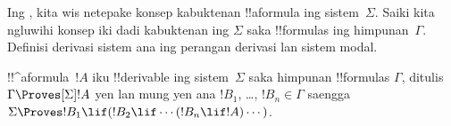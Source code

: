 \documentclass[../../../include/open-logic-section]{subfiles}
\begin{document}


Ing , kita wis netepake konsep kabuktenan
!!a{formula} ing sistem~$\Sigma$. Saiki kita ngluwihi konsep iki dadi
kabuktenan ing $\Sigma$ saka !!{formula}s ing himpunan~$\Gamma$. Definisi derivasi sistem ana ing perangan derivasi lan sistem modal.

\begin{defn}
  !!^a{formula}~$!A$ iku !!{derivable} ing sistem~$\Sigma$ saka himpunan
  !!{formula}s $\Gamma$, ditulis $\Gamma \Proves[\Sigma] !A$ yen lan
  mung yen ana $!B_1$, \dots, $!B_n \in \Gamma$ saengga
  $\Sigma \Proves !B_1 \lif (!B_2 \lif \cdots (!B_n \lif !A)
  \cdots)$.
\end{defn}
\end{document}
